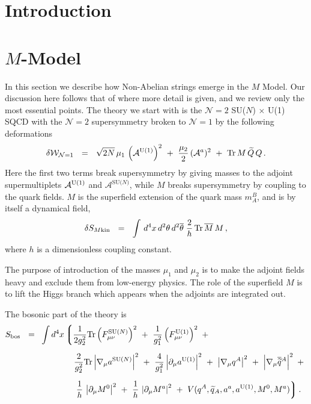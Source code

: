 \documentclass[12pt]{article}
\def\beq{\begin{equation}}
\def\eeq{\end{equation}}
\def\Tr{{\rm Tr}}
\newcommand{\ntwo}{${\mathcal N}=2$ }
\newcommand{\none}{${\mathcal N}=1$ }
\newcommand{\p}{\partial}
\newcommand{\wt}{\widetilde}
\newcommand{\ov}{\overline}
\newcommand{\mc}[1]{\mathcal{#1}}
\newcommand{\lgr}{\left\lgroup}
\newcommand{\rgr}{\right\rgroup}
\newcommand{\sunu}{{\rm SU($N$) $\times$ U(1) }}
\newcommand{\aU}{a^{\rm U(1)}}
\newcommand{\aN}{a^\text{SU($N$)}}
\begin{document}
%
%
\section{Introduction}


%
%
\section{{\boldmath $M$}-Model}

In this section we describe how Non-Abelian strings emerge in the $M$ Model.
Our discussion here follows that of \cite{GSYmmodel} where more detail
is given, and we review only the most essential points.
The theory we start with is the \ntwo \sunu SQCD with the \ntwo supersymmetry
broken to \none by the following deformations
\beq
\label{none}
	\delta\mc{W}_{\mc{N}=1} ~~=~~ \sqrt{2N}\,\mu_1\, \left( \mc{A}^{\rm U(1)} \right)^2 
				~+~ \frac{\mu_2}{2}\, (\mc{A}^a)^2
				~+~ \Tr\, M\, \wt{Q}\, Q\,.
\eeq
Here the first two terms break supersymmetry by giving masses to the adjoint 
supermultiplets $ \mc{A}^{\rm U(1)} $ and $ \mc{A}^\text{SU($N$)} $, 
while $ M $ breaks supersymmetry by coupling to the quark fields.
$ M $ is the superfield extension of the quark mass $ m_A^B $, and is by itself a dynamical field,
\[
	\delta S_{M \rm kin} ~~=~~ \int\, d^4x\, d^2\theta\, d^2\ov{\theta} \;
					\frac{2}{h}\, \Tr\, \ov{M}\, M \,,
\]
where $ h $ is a dimensionless coupling constant. 

The purpose of introduction of the masses $ \mu_1 $ and $ \mu_2 $ is to make the adjoint fields
heavy and exclude them from low-energy physics.
The role of the superfield $ M $ is to lift the Higgs branch which appears when
the adjoints are integrated out.

The bosonic part of the theory is
\begin{align}
%
\label{theory}
	S_{\rm bos} ~~=~~ & \int d^4 x 
		\lgr
			\frac{1}{2g_2^2}\Tr \left(F_{\mu\nu}^\text{SU($N$)}\right)^2  ~+~
			\frac{1}{g_1^2} \left(F_{\mu\nu}^{\rm U(1)}\right)^2 ~+~ 
			\right. 
			\\[2mm]
%
\notag
		&
			\phantom{\int d^4 x \lgr\right.\,}
			\frac{2}{g_2^2}\Tr \left|\nabla_\mu \aN \right|^2   ~+~
			\frac{4}{g_1^2} \left|\p_\mu \aU \right|^2
			~+~
			\left| \nabla_\mu q^A \right|^2 ~+~ \left|\nabla_\mu \ov{\wt{q}}{}^A \right|^2 
			~+~
			\\[2mm]
%
\notag
		&
			\phantom{\int d^4 x \lgr\right.\,}
		\left.
			\frac{1}{h}\, \left| \p_\mu M^0 \right|^2  ~+~
			\frac{1}{h}\, \left| \p_\mu M^a \right|^2 ~+~
			V(q^A, \wt{q}{}_A, a^a, \aU, M^0, M^a)
		\rgr .
\end{align}
\end{document}
